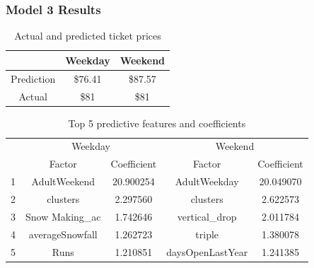 \documentclass{beamer}
\begin{document}
\begin{frame}
\frametitle{Model 3 Results}

\begin{table}
\begin{tabular}{c | c | c }
& Weekday & Weekend \\ \hline
Prediction & \$76.41 & \$87.57 \\ \hline
Actual & \$81 & \$81 \\ \hline
\end{tabular}
\label{tab:prices}
\caption{Actual and predicted ticket prices}
\end{table}

\begin{table}
\begin{tabular}{c | c | c | c | c}
& \multicolumn{2}{c}{Weekday} & \multicolumn{2}{c}{Weekend} \\
& Factor & Coefficient & Factor & Coefficient \\ \hline
1 & AdultWeekend  & 20.900254 & AdultWeekday & 20.049070 \\ \hline
2 & clusters & 2.297560 & clusters & 2.622573  \\ \hline
3 & Snow Making\_ac &1.742646  & vertical\_drop  & 2.011784\\ \hline
4 & averageSnowfall & 1.262723 & triple & 1.380078\\ \hline
5 &Runs & 1.210851 & daysOpenLastYear & 1.241385 \\ \hline
\end{tabular}
\label{tab:features}
\caption{Top 5 predictive features and coefficients}
\end{table}

\end{frame}
\end{document}
